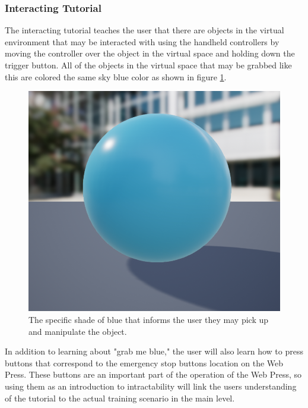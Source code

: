 \documentclass[onecolumn, draftclsnofoot,10pt, compsoc]{IEEEtran}
\begin{document}
\subsubsection{Interacting Tutorial}

The interacting tutorial teaches the user that there are objects in the virtual environment that may be interacted with using the handheld controllers by moving the controller over the object in the virtual space and holding down the trigger button. All of the objects in the virtual space that may be grabbed like this are colored the same sky blue color as shown in figure \ref{fig:skyblue}.

\begin{figure}[ht!]
    \centering
    \includegraphics[scale=0.5]{touchMeBlue.png}
    \caption{The specific shade of blue that informs the user they may pick up and manipulate the object.}
    \label{fig:skyblue}
\end{figure}

In addition to learning about "grab me blue," the user will also learn how to press buttons that correspond to the emergency stop buttons location on the Web Press. These buttons are an important part of the operation of the Web Press, so using them as an introduction to intractability will link the users understanding of the tutorial to the actual training scenario in the main level.
\end{document}
